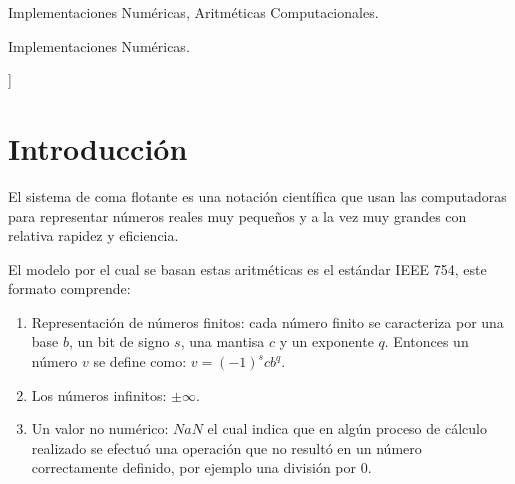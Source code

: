 \documentclass[a4paper,10pt,twocolumn]{article}
\begin{document}
\begin{keywords}
	Implementaciones Numéricas,
	Aritméticas Computacionales.
\end{keywords}

\begin{topics}
	Implementaciones Numéricas.
\end{topics}


\vspace{0.8cm}
]



\section{Introducción}\label{sec:intro}
	El sistema de coma flotante es una notación científica que usan las computadoras para representar números reales muy pequeños y a la vez muy grandes con relativa rapidez y eficiencia.
  
	El modelo por el cual se basan estas aritméticas es el estándar IEEE 754, este formato comprende:
	\begin{enumerate}
  
  		\item Representación de números finitos: cada número finito se caracteriza por una base $b$, un bit de signo $s$, una mantisa $c$ y un exponente $q$. Entonces un número $v$ se define como: $v=(-1)^s c b^q$. 
  	
  		\item Los números infinitos: $\pm\infty$.
  	
  		\item Un valor no numérico: $NaN$ el cual indica que en algún proceso de cálculo realizado se efectuó una operación que no resultó en un número correctamente definido, por ejemplo una división por 0.
	\end{enumerate}
  
\end{document}
